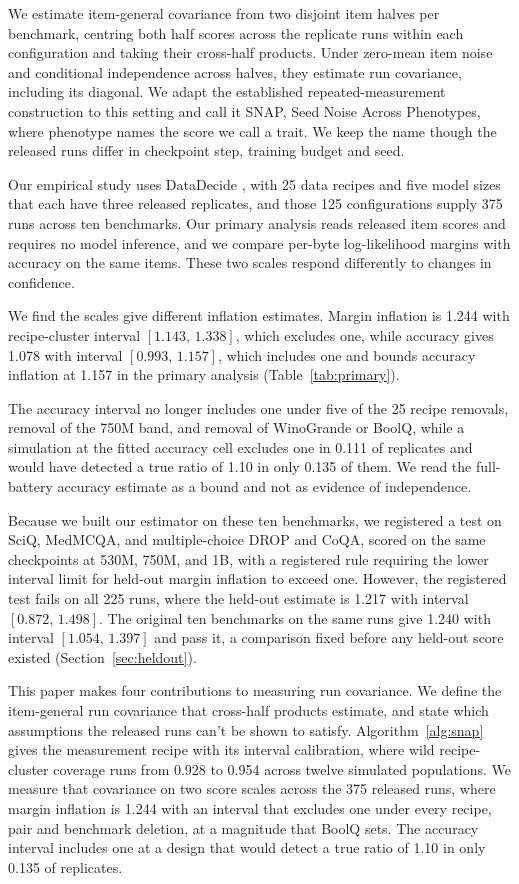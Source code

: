 \documentclass{article}
\newcommand{\ci}[2]{\ensuremath{[#1,\,#2]}}
\begin{document}
We estimate item-general covariance from two disjoint item halves per benchmark, centring both half scores across the replicate runs within each configuration and taking their cross-half products. Under zero-mean item noise and conditional independence across halves, they estimate run covariance, including its diagonal. We adapt the established repeated-measurement construction to this setting and call it SNAP, Seed Noise Across Phenotypes, where phenotype names the score we call a trait. We keep the name though the released runs differ in checkpoint step, training budget and seed.

Our empirical study uses DataDecide \citep{magnusson2025}, with 25 data recipes and five model sizes that each have three released replicates, and those 125 configurations supply 375 runs across ten benchmarks. Our primary analysis reads released item scores and requires no model inference, and we compare per-byte log-likelihood margins with accuracy on the same items. These two scales respond differently to changes in confidence.

We find the scales give different inflation estimates. Margin inflation is 1.244 with recipe-cluster interval \ci{1.143}{1.338}, which excludes one, while accuracy gives 1.078 with interval \ci{0.993}{1.157}, which includes one and bounds accuracy inflation at 1.157 in the primary analysis (Table~\ref{tab:primary}).

The accuracy interval no longer includes one under five of the 25 recipe removals, removal of the 750M band, and removal of WinoGrande or BoolQ, while a simulation at the fitted accuracy cell excludes one in 0.111 of replicates and would have detected a true ratio of 1.10 in only 0.135 of them. We read the full-battery accuracy estimate as a bound and not as evidence of independence.

Because we built our estimator on these ten benchmarks, we registered a test on SciQ, MedMCQA, and multiple-choice DROP and CoQA, scored on the same checkpoints at 530M, 750M, and 1B, with a registered rule requiring the lower interval limit for held-out margin inflation to exceed one. However, the registered test fails on all 225 runs, where the held-out estimate is 1.217 with interval \ci{0.872}{1.498}. The original ten benchmarks on the same runs give 1.240 with interval \ci{1.054}{1.397} and pass it, a comparison fixed before any held-out score existed (Section~\ref{sec:heldout}).

This paper makes four contributions to measuring run covariance. We define the item-general run covariance that cross-half products estimate, and state which assumptions the released runs can't be shown to satisfy. Algorithm~\ref{alg:snap} gives the measurement recipe with its interval calibration, where wild recipe-cluster coverage runs from 0.928 to 0.954 across twelve simulated populations. We measure that covariance on two score scales across the 375 released runs, where margin inflation is 1.244 with an interval that excludes one under every recipe, pair and benchmark deletion, at a magnitude that BoolQ sets. The accuracy interval includes one at a design that would detect a true ratio of 1.10 in only 0.135 of replicates.
\end{document}
